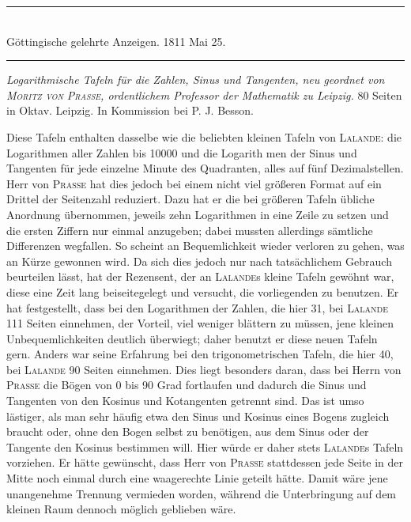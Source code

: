 \begin{center}
\rule{0.60\linewidth}{0.3pt}\\
Göttingische gelehrte Anzeigen. 1811 Mai 25.\\
\rule{0.60\linewidth}{0.3pt}
\end{center}

\textit{Logarithmische Tafeln für die Zahlen, Sinus und Tangenten, neu geordnet
von \textup{\textsc{Moritz von Prasse}}, ordentlichem Professor der Mathematik zu Leipzig.} 80 Seiten in Oktav. Leipzig. In Kommission bei P. J. Besson.

Diese Tafeln enthalten dasselbe wie die beliebten kleinen Tafeln von \textsc{Lalande}: die Logarithmen aller Zahlen bis 10000 und die Logarith%
men der Sinus und Tangenten für jede einzelne Minute des Quadranten, alles auf fünf Dezimalstellen. Herr von \textsc{Prasse} hat dies jedoch bei einem nicht viel größeren Format auf ein Drittel der Seitenzahl reduziert. Dazu hat er die bei größeren Tafeln übliche Anordnung übernommen, jeweils zehn Logarithmen in eine Zeile zu setzen und die ersten Ziffern nur einmal anzugeben; dabei mussten allerdings sämtliche Differenzen wegfallen. So scheint an Bequemlichkeit wieder verloren zu gehen, was an Kürze gewonnen wird. Da sich dies jedoch nur nach tatsächlichem Gebrauch beurteilen lässt, hat der Rezensent, der an \textsc{Lalande}s kleine Tafeln gewöhnt war, diese eine Zeit lang beiseitegelegt und versucht, die vorliegenden zu benutzen. Er hat festgestellt, dass bei den Logarithmen der Zahlen, die hier 31, bei \textsc{Lalande} 111 Seiten einnehmen, der Vorteil, viel weniger blättern zu müssen, jene kleinen Unbequemlichkeiten deutlich überwiegt; daher benutzt er diese neuen Tafeln gern. Anders war seine Erfahrung bei den trigonometrischen Tafeln, die hier 40, bei \textsc{Lalande} 90 Seiten einnehmen. Dies liegt besonders daran, dass bei Herrn von \textsc{Prasse} die Bögen von 0 bis 90 Grad fortlaufen und dadurch die Sinus und Tangenten von den Kosinus und Kotangenten getrennt sind. Das ist umso lästiger, als man sehr häufig etwa den Sinus und Kosinus eines Bogens zugleich braucht oder, ohne den Bogen selbst zu benötigen, aus dem Sinus oder der Tangente den Kosinus bestimmen will. Hier würde er daher stets \textsc{Lalande}s Tafeln vorziehen. Er hätte gewünscht, dass Herr von \textsc{Prasse} stattdessen jede Seite in der Mitte noch einmal durch eine waagerechte Linie geteilt hätte. Damit wäre jene unangenehme Trennung vermieden worden, während die Unterbringung auf dem kleinen Raum dennoch möglich geblieben wäre.

